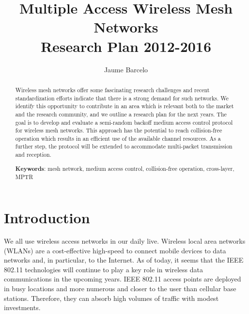 \documentclass[a4paper,twocolumns]{article}%
\begin{document}
\title{Multiple Access Wireless Mesh Networks \\ Research Plan 2012-2016}

\author{Jaume Barcelo}


\date{}

\maketitle

\begin{abstract}
Wireless mesh networks offer some fascinating research challenges and recent standardization efforts indicate that there is a strong demand for such networks.
We identify this opportunity to contribute in an area which is relevant both to the market and the research community, and we outline a research plan for the next years.
The goal is to develop and evaluate a semi-random backoff medium access control protocol for wireless mesh networks.
This approach has the potential to reach collision-free operation which results in an efficient use of the available channel resources.
As a further step, the protocol will be extended to accommodate multi-packet transmission and reception.

\vspace{0.5cm}
\textbf{Keywords}: mesh network, medium access control, collision-free operation, cross-layer, MPTR

\end{abstract}

\tableofcontents

\clearpage


\section{Introduction}

We all use wireless access networks in our daily live.
Wireless local area networks (WLANs) are a cost-effective high-speed to connect mobile devices to data networks and, in particular, to the Internet.
As of today, it seems that the IEEE 802.11 technologies will continue to play a key role in wireless data communications in the upcoming years.
IEEE 802.11 access points are deployed in busy locations and more numerous and closer to the user than cellular base stations.
Therefore, they can absorb high volumes of traffic with modest investments.
\end{document}
